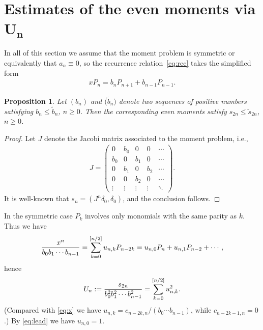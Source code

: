 \documentclass[11pt]{article}
\numberwithin{equation}{section}
\newtheorem{prop}[thm]{Proposition}
\begin{document}
\setcounter{section}{2}
\setcounter{subsection}{0}
\setcounter{subsubsection}{0}
\setcounter{thm}{7}
\setcounter{equation}{14}
\section[Estimates of the even moments via $U_n$]{Estimates of the even moments via $\boldsymbol{U_n}$}\label{section3}
In all of this section we assume that the moment problem is symmetric or equivalently that $a_n\equiv 0$, so the recurrence relation~\eqref{eq:rec} takes the simplified form
\begin{gather}\label{eq:recsym}
xP_n=b_nP_{n+1}+b_{n-1}P_{n-1}.
\end{gather}

\begin{prop}\label{thm:increasofbn}Let $(b_n)$ and $\big(\tilde{b}_n\big)$ denote two sequences of positive numbers satisfying $b_n\le \tilde{b}_n$, $n\ge 0$. Then the corresponding even moments satisfy $s_{2n}\le \tilde{s}_{2n}$, $n\ge 0$.
\end{prop}

\begin{proof}Let $J$ denote the Jacobi matrix associated to the moment problem, i.e.,
\begin{gather}\label{eq:Jacobimat}
J=\begin{pmatrix} 0 & b_0 & 0 & 0 & \cdots\\
 b_0 & 0 & b_1 & 0 & \cdots\\
 0 & b_1 & 0 & b_2 & \cdots\\
 0 & 0 & b_2 & 0 & \cdots\\
 \vdots & \vdots & \vdots & \vdots & \ddots
\end{pmatrix}.
\end{gather}
It is well-known that $s_n=(J^n\delta_0,\delta_0)$, and the conclusion follows.
\end{proof}

In the symmetric case $P_k$ involves only monomials with the same parity as $k$. Thus we have
 \begin{gather}\label{eq:u0}
{x^n\over b_0b_1\cdots b_{n-1}}=\sum_{k=0}^{[n/2]}u_{n,k}P_{n-2k}=u_{n,0}P_n+u_{n,1}P_{n-2}+\cdots,
\end{gather}
 hence
 \begin{gather}\label{eq:u1}
U_n:= {s_{2n}\over b_0^2b_1^2\cdots b_{n-1}^2}=\sum_{k=0}^{[n/2]}u_{n,k}^2.
 \end{gather}
(Compared with \eqref{eq:x} we have $u_{n,k}=c_{n-2k,n}/(b_0\cdots b_{n-1})$, while $c_{n-2k-1,n}=0$.) By \eqref{eq:lead} we have $u_{n,0}=1$.
\end{document}
